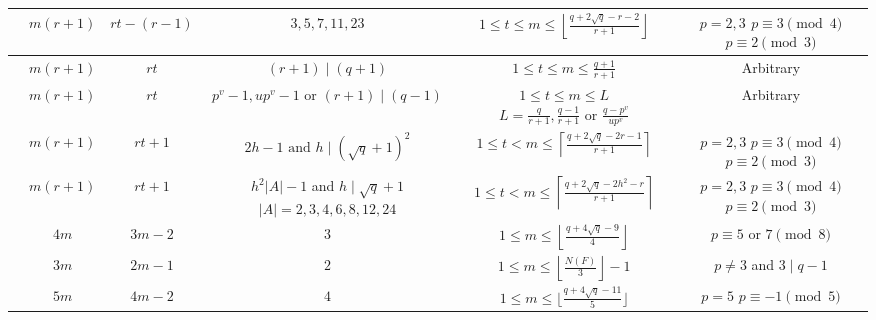\documentclass[journal,12pt,onecolumn]{IEEEtran}
\begin{document}
\begin{table}[!t]
\begin{center}
{\begin{tabular}{cccccc}
          \cite[Thm. 2]{Optimal_Locally_Repairable_Codes_Via_Elliptic_Curves} & $m(r+1)$ & $rt-(r-1)$ & $3,5,7,11,23$ & $1\le t\le m\le\left\lfloor\frac{q+2\sqrt{q}-r-2}{r+1}\right\rfloor$ & \makecell{\(p = 2, 3\) \\ \( p \equiv 3 \pmod{4} \) \\ \(p \equiv 2 \pmod{3}\)} \\
        \midrule[0.5pt]
        
          \cite[Thm. V.3]{Construction_of_Optimal_Locally_Repairable_Codes_via_Automorphism_Groups_of_Rational_Function_Fields} & $m(r+1)$ & $rt$ & $(r+1)\mid(q+1)$ & $1\le t\le m\le\frac{q+1}{r+1}$ & Arbitrary \\
        \midrule[0.5pt]
        
           \cite[Sec. IV]{Construction_of_Optimal_Locally_Repairable_Codes_via_Automorphism_Groups_of_Rational_Function_Fields} & $m(r+1)$ & $rt$ & \makecell{$p^v-1,up^v-1$ \\ or $(r+1)\mid (q-1)$} & \makecell{$1\le t\le m\le L$ \\ $L = \frac{q}{r+1},\frac{q-1}{r+1}\text{ or }\frac{q-p^v}{up^v}$ } & Arbitrary \\
        \midrule[0.5pt]

        \cite[Thm. 1.1]{MA2023105686} & $m(r+1)$ & $rt+1$ & $2h-1\text{ and }h\mid (\sqrt{q}+1)^2$ & $1\le t<m\le\left\lceil\frac{q+2\sqrt{q}-2r-1}{r+1}\right\rceil$ & \makecell{\(p = 2, 3\) \\ \( p \equiv 3 \pmod{4} \) \\ \(p \equiv 2 \pmod{3}\)} \\
        \midrule[0.5pt]

        \cite[Thm. 1.2]{MA2023105686} & $m(r+1)$ & $rt+1$ & \makecell{$h^2|A|-1$ and $h\mid \sqrt{q}+1$ \\ $|A|=2,3,4,6,8,12,24$} & $1\le t<m\le\left\lceil\frac{q+2\sqrt{q}-2h^2-r}{r+1}\right\rceil$ & \makecell{\(p = 2, 3\) \\ \( p \equiv 3 \pmod{4} \) \\ \(p \equiv 2 \pmod{3}\)} \\
        \midrule[0.5pt]
        
        \cite[Thm. 3(i)]{11223270} & $4m$ & $3m-2$ & $3$ & $1\le m\le\left\lfloor\frac{q+4\sqrt{q}-9}{4}\right\rfloor$ & $p\equiv 5$ or $7 \pmod{8}$\\
        \midrule[0.5pt]
        
        \cite[Thm. 3(ii)]{11223270} & $3m$ & $2m-1$ & $2$ & $1\le m\le\left\lfloor\frac{N(F)}{3}\right\rfloor-1$ & $p\neq3$ and $3\mid q-1$\\

        \midrule[0.5pt]
        
        \cite[Thm. 3(iii)]{11223270} & $5m$ & $4m-2$ & $4$ & $1\le  m\le\big\lfloor\frac{q+4\sqrt{q}-11}{5}\big\rfloor$ & \makecell{\(p = 5\) \\ \( p \equiv -1 \pmod{5} \)}\\
        \bottomrule[1.2pt]
	\end{tabular}
    }
    \end{center}
	\label{opt_parameter}
    \end{table}
\end{document}
